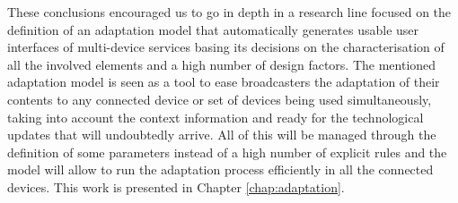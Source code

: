 These conclusions encouraged us to go in depth in a research line focused on the definition of an adaptation model that automatically generates usable user interfaces of multi-device services basing its decisions on the characterisation of all the involved elements and a high number of design factors. The mentioned adaptation model is seen as a tool to ease broadcasters the adaptation of their contents to any connected device or set of devices being used simultaneously, taking into account the context information and ready for the technological updates that will undoubtedly arrive. All of this will be managed through the definition of some parameters instead of a high number of explicit rules and the model will allow to run the adaptation process efficiently in all the connected devices. This work is presented in Chapter \ref{chap:adaptation}.